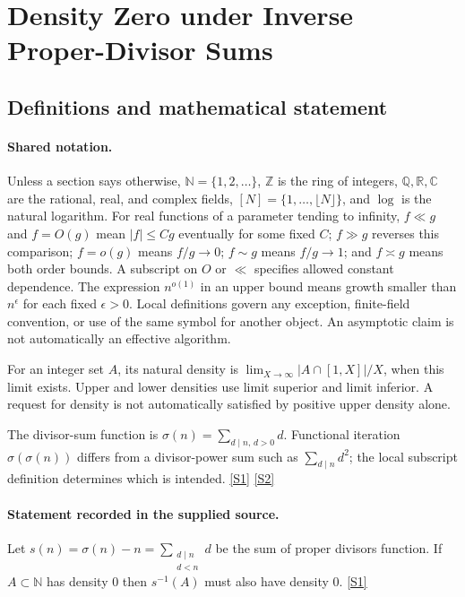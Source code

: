 \documentclass[11pt,a4paper]{article}
\newcommand{\N}{\mathbb{N}}
\newcommand{\Z}{\mathbb{Z}}
\newcommand{\Q}{\mathbb{Q}}
\newcommand{\R}{\mathbb{R}}
\newcommand{\C}{\mathbb{C}}
\newcommand{\sref}[2]{\hyperlink{source:#1:#2}{[S#2]}}
\begin{document}
\section{Density Zero under Inverse Proper-Divisor Sums}\label{statement}


\subsection{Definitions and mathematical statement}

\paragraph{Shared notation.}Unless a section says otherwise, $\N=\{1,2,\ldots\}$,
$\Z$ is the ring of integers, $\Q,\R,\C$ are the rational, real, and complex
fields, $[N]=\{1,\ldots,\lfloor N\rfloor\}$, and $\log$ is the natural
logarithm. For real functions of a parameter tending to infinity,
$f\ll g$ and $f=O(g)$ mean $|f|\leq Cg$ eventually for some fixed $C$;
$f\gg g$ reverses this comparison; $f=o(g)$ means $f/g\to0$;
$f\sim g$ means $f/g\to1$; and $f\asymp g$ means both order bounds.
A subscript on $O$ or $\ll$ specifies allowed constant dependence.
The expression $n^{o(1)}$ in an upper bound means growth smaller than
$n^\epsilon$ for each fixed $\epsilon>0$. Local definitions govern any
exception, finite-field convention, or use of the same symbol for another
object. An asymptotic claim is not automatically an effective algorithm.



For an integer set $A$, its natural density is $\lim_{X\to\infty}|A\cap[1,X]|/X$, when this limit exists. Upper and lower densities use limit superior and limit inferior. A request for density is not automatically satisfied by positive upper density alone.

The divisor-sum function is $\sigma(n)=\sum_{d\mid n,\,d>0}d$. Functional iteration $\sigma(\sigma(n))$ differs from a divisor-power sum such as $\sum_{d\mid n}d^2$; the local subscript definition determines which is intended. \sref{statement}{1} \sref{statement}{2}

\paragraph{Statement recorded in the supplied source.}
Let $ s(n)=\sigma(n)-n=\sum_{\substack{d\mid n\\ d<n}}d $ be the sum of proper divisors function.
If $A\subset \mathbb{N}$ has density $0$ then $s^{-1}(A)$ must also have density $0$. \sref{statement}{1}
\end{document}
